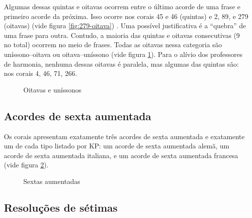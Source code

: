 Algumas dessas quintas e oitavas ocorrem entre o último acorde de uma
frase e primeiro acorde da próxima.  Isso
ocorre nos corais 45 e 46 (quintas) e 2, 89, e 279 (oitavas) (vide
figura \ref{fig:279-oitava}) . Uma
possível justificativa é a ``quebra'' de uma frase para
outra. Contudo, a maioria das quintas e oitavas consecutivas (9 no
total) ocorrem no meio de frases. Todas as oitavas nessa categoria são
uníssono--oitava ou oitava--uníssono (vide figura
\ref{fig:oitavas-e-unissonos}).  Para o alívio dos professores de harmonia, nenhuma dessas
oitavas é paralela, mas algumas das quintas são: nos corais 4, 46, 71,
266.

\begin{figure}
  \centering
  \qquad
  \qquad
  \caption{Oitavas e uníssonos}
  \label{fig:oitavas-e-unissonos}
\end{figure}

\subsection{Acordes de sexta aumentada}
\label{sec:acordes-de-sexta}

Os corais apresentam exatamente três acordes de sexta aumentada e
exatamente um de cada tipo listado por KP: um acorde de sexta
aumentada alemã, um acorde de sexta aumentada italiana, e um acorde de
sexta aumentada francesa (vide figura \ref{fig:sextas-aumentadas}).

\begin{figure}
  \centering
  \caption{Sextas aumentadas}
  \label{fig:sextas-aumentadas}
\end{figure}

\subsection{Resoluções de sétimas}
\label{sec:setimas}

